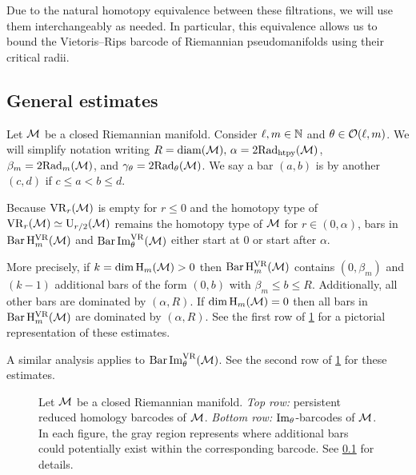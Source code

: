 \medskip Due to the natural homotopy equivalence between these filtrations, we will use them interchangeably as needed. 
In particular, this equivalence allows us to bound the Vietoris--Rips barcode of Riemannian pseudomanifolds using their critical radii. 

\subsection{General estimates}\label{ss:barcode_general}

Let \(\mathcal{M}\) be a closed Riemannian manifold.
Consider \(\ell, m \in \mathbb{N}\) and \(\theta \in \mathcal{O}(\ell,m)\).
We will simplify notation writing \(R = \operatorname{diam}(\mathcal{M}),\, \alpha = 2\mathrm{Rad}_{\mathrm{htpy}}(\mathcal{M})\), \(\beta_m = 2\mathrm{Rad}_{m}(\mathcal{M})\), and \(\gamma_\theta = 2\mathrm{Rad}_{\theta}(\mathcal{M})\).
We say a bar $(a, b)$ is  by another $(c,d)$ if $c \leq a < b \leq d$.

Because $\mathrm{VR}_r(\mathcal{M})$ is empty for \(r \leq 0\) and the homotopy type of $\mathrm{VR}_r(\mathcal{M})\simeq \mathrm{U}_{r/2}(\mathcal{M})$ remains the homotopy type of $\mathcal{M}$ for $r \in (0, \alpha)$, bars in \(\operatorname{Bar} \mathrm{H}_m^{\mathrm{VR}}(\mathcal{M})\) and $\operatorname{Bar}\operatorname{Im}_\theta^{\mathrm{VR}}(\mathcal{M})$ either start at $0$ or start after $\alpha$.

More precisely, if \(k = \dim \operatorname{H}_m(\mathcal{M}) > 0\) then $\operatorname{Bar}\mathrm{H}_m^{\mathrm{VR}}(\mathcal{M})$ contains $(0, \beta_m)$ and \((k - 1)\) additional bars of the form \((0, b)\) with \(\beta_m \leq b \leq R\).
Additionally, all other bars are dominated by \((\alpha, R)\).
If \(\dim \operatorname{H}_m(\mathcal{M}) = 0\) then all bars in \(\operatorname{Bar}\mathrm{H}_m^{\mathrm{VR}}(\mathcal{M})\) are dominated by \((\alpha, R)\).
See the first row of \cref{fig:barcodes_general} for a pictorial representation of these estimates.

A similar analysis applies to $\operatorname{Bar}\operatorname{Im}_\theta^{\mathrm{VR}}(\mathcal{M})$.
See the second row of \cref{fig:barcodes_general} for these estimates.

\begin{figure}
	\centering
	
	\caption{Let $\mathcal{M}$ be a closed Riemannian manifold.
    \emph{Top row:} persistent reduced homology barcodes of $\mathcal{M}$.
	\emph{Bottom row:} $\operatorname{Im}_\theta$-barcodes of $\mathcal{M}$.
    In each figure, the gray region represents where additional bars could potentially exist within the corresponding barcode.
    See \cref{ss:barcode_general} for details.}
	\label{fig:barcodes_general}
\end{figure}